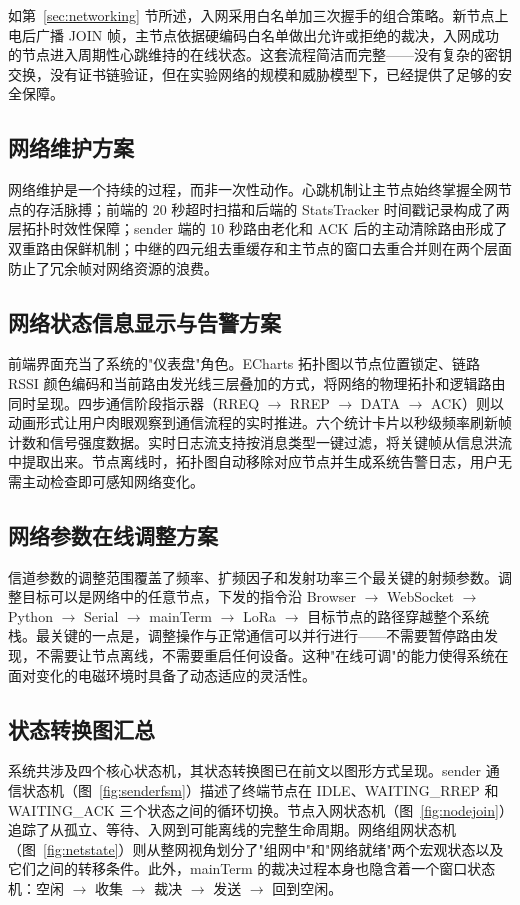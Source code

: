 \documentclass[12pt,a4paper]{ctexart}
\begin{document}
如第~\ref{sec:networking} 节所述，入网采用白名单加三次握手的组合策略。新节点上电后广播 JOIN 帧，主节点依据硬编码白名单做出允许或拒绝的裁决，入网成功的节点进入周期性心跳维持的在线状态。这套流程简洁而完整——没有复杂的密钥交换，没有证书链验证，但在实验网络的规模和威胁模型下，已经提供了足够的安全保障。

\subsection{网络维护方案}

网络维护是一个持续的过程，而非一次性动作。心跳机制让主节点始终掌握全网节点的存活脉搏；前端的 20 秒超时扫描和后端的 StatsTracker 时间戳记录构成了两层拓扑时效性保障；sender 端的 10 秒路由老化和 ACK 后的主动清除路由形成了双重路由保鲜机制；中继的四元组去重缓存和主节点的窗口去重合并则在两个层面防止了冗余帧对网络资源的浪费。

\subsection{网络状态信息显示与告警方案}

前端界面充当了系统的"仪表盘"角色。ECharts 拓扑图以节点位置锁定、链路 RSSI 颜色编码和当前路由发光线三层叠加的方式，将网络的物理拓扑和逻辑路由同时呈现。四步通信阶段指示器（RREQ $\to$ RREP $\to$ DATA $\to$ ACK）则以动画形式让用户肉眼观察到通信流程的实时推进。六个统计卡片以秒级频率刷新帧计数和信号强度数据。实时日志流支持按消息类型一键过滤，将关键帧从信息洪流中提取出来。节点离线时，拓扑图自动移除对应节点并生成系统告警日志，用户无需主动检查即可感知网络变化。

\subsection{网络参数在线调整方案}

信道参数的调整范围覆盖了频率、扩频因子和发射功率三个最关键的射频参数。调整目标可以是网络中的任意节点，下发的指令沿 Browser $\to$ WebSocket $\to$ Python $\to$ Serial $\to$ mainTerm $\to$ LoRa $\to$ 目标节点的路径穿越整个系统栈。最关键的一点是，调整操作与正常通信可以并行进行——不需要暂停路由发现，不需要让节点离线，不需要重启任何设备。这种"在线可调"的能力使得系统在面对变化的电磁环境时具备了动态适应的灵活性。

\subsection{状态转换图汇总}

系统共涉及四个核心状态机，其状态转换图已在前文以图形方式呈现。sender 通信状态机（图~\ref{fig:senderfsm}）描述了终端节点在 IDLE、WAITING\_RREP 和 WAITING\_ACK 三个状态之间的循环切换。节点入网状态机（图~\ref{fig:nodejoin}）追踪了从孤立、等待、入网到可能离线的完整生命周期。网络组网状态机（图~\ref{fig:netstate}）则从整网视角划分了"组网中"和"网络就绪"两个宏观状态以及它们之间的转移条件。此外，mainTerm 的裁决过程本身也隐含着一个窗口状态机：空闲 $\to$ 收集 $\to$ 裁决 $\to$ 发送 $\to$ 回到空闲。
\end{document}
